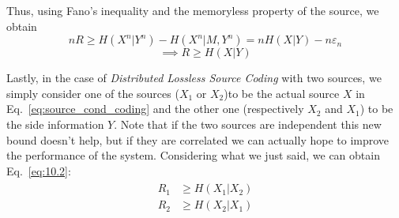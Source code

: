 Thus, using Fano's inequality and the memoryless property of the source, we obtain
%
\begin{equation}
nR \geq H(X^n|Y^n) - H(X^n|M,Y^n) = nH(X|Y) - n\varepsilon_n
\end{equation}
\begin{equation} \label{eq:source_cond_coding}
\implies R \geq H(X|Y)
\end{equation}

Lastly, in the case of \textit{Distributed Lossless Source Coding} with two sources, we simply consider one of the sources ($X_1$ or $X_2$)to be the actual source $X$ in Eq.~\eqref{eq:source_cond_coding} and the other one (respectively $X_2$ and $X_1$) to be the side information $Y$. Note that if the two sources are independent this new bound doesn't help, but if they are correlated we can actually hope to improve the performance of the system. Considering what we just said, we can obtain Eq.~\eqref{eq:10.2}:
%
\begin{align}
\begin{split}
R_1 &\geq H(X_1|X_2)\\
R_2 &\geq H(X_2|X_1)
\end{split}
\tag{10.2}
\label{eq:10.2}
\end{align}